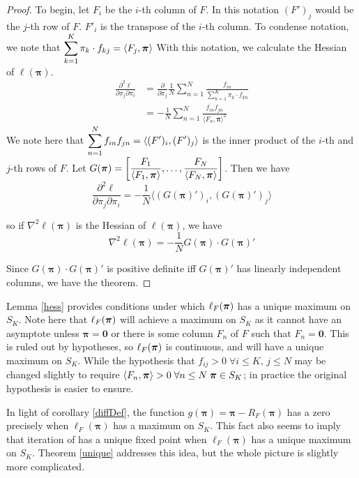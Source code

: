 \begin{proof}
To begin, let $F_i$ be the $i$-th column of $F$.  In this notation $(F')_j$ would be the $j$-th row of $F$. $F'_i$ is the transpose of the $i$-th column.  To condense notation, we note that \(\displaystyle \sum_{k=1}^{K}\pi_k\cdot f_{kj}=\langle F_j,\bm\pi\rangle\)
With this notation, we calculate the Hessian of $\ell(\bm\pi)$.
\begin{align}
\frac{\partial^2\ell}{\partial\pi_j\partial\pi_i}&=\frac{\partial}{\partial\pi_j}\frac 1N\sum_{n=1}^{N}\frac{f_{in}}{\sum_{k=1}^{K}\pi_k\cdot f_{kn}}\\
&=-\frac 1N\sum_{n=1}^{N}\frac{f_{in} f_{jn}}{\langle F_n,\bm\pi\rangle^2}
\end{align}
We note here that \(\displaystyle \sum_{n=1}^{N}f_{in}f_{jn} =\langle (F')_i,(F')_j\rangle\) is the inner product of the $i$-th and $j$-th rows of $F$. Let $\displaystyle G(\bm\pi)=\left[\frac{F_1}{\langle F_1,\bm\pi\rangle},\ldots,\frac{F_N}{\langle F_N,\bm\pi\rangle}\right] $. Then we have
\begin{equation}
\frac{\partial^2\ell}{\partial\pi_j\partial\pi_i}=-\frac 1N \langle(G(\bm\pi)')_i,(G(\bm\pi)')_j\rangle
\end{equation}


so if $\nabla^2\ell(\bm\pi)$ is the Hessian of $\ell(\bm\pi)$, we have
\begin{equation}\label{hessDef}
\nabla^2\ell(\bm\pi)=-\frac 1N G(\bm\pi)\cdot G(\bm\pi)'
\end{equation}

Since $G(\bm\pi)\cdot G(\bm\pi)'$ is positive definite iff $G(\bm\pi)'$ has linearly independent columns, we have the theorem.
\end{proof}

Lemma \ref{hess} provides conditions under which \( \ell_{F}({\bm\pi}) \) has a unique maximum on \( S_K \).  Note here that \(\ell_{F}({\bm\pi}) \) will achieve a maximum on \( S_K \) as it cannot have an asymptote unless \( \bm\pi = \bm 0 \) or there is some column \( F_n \) of \( F \) such that \( F_n=\bm 0 \).  This is ruled out by hypotheses, so \( \ell_{F}({\bm\pi}) \)  is continuous, and will have a unique maximum on \( S_K \).  While the hypothesis that \( f_{ij}>0\;\forall i\leq K,\,j\leq N \) may be changed slightly to require \( \langle F_n,\bm\pi\rangle>0\;\forall n\leq N\;\bm\pi\in S_K \); in practice the original hypothesis is easier to ensure.

In light of corollary \ref{diffDef}, the function \( g(\bm\pi) = \bm\pi-R_F(\bm\pi) \) has a zero precisely when \( \ell_F(\bm\pi) \) has a maximum on \( S_K \).  
This fact also seems to imply that iteration of   has a unique fixed point when \( \ell_F(\bm\pi) \) has a unique maximum on \( S_K \).  Theorem \ref{unique} addresses this idea, but the whole picture is slightly more complicated.



